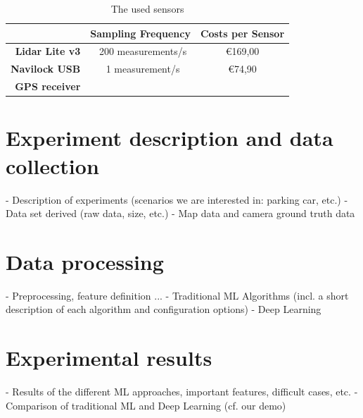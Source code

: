 \begin{table}

\bgroup
\def\arraystretch{1.5}
\begin{tabular}{| r || c | c |}
\hline
   & 
   \textbf{Sampling Frequency} & 
   \textbf{Costs per Sensor} \\
\hline
  \textbf{Lidar Lite v3} & 
   ~200 measurements/s &
   \euro{169,00} \\
\hline
  \textbf{Navilock USB} & 
   ~1 measurement/s &
   \euro{74,90} \\
   \textbf{GPS receiver} & & \\
\hline

\end{tabular}
\egroup

\caption{The used sensors}
\label{table:sensors_capabilities}
\end{table}


\section{Experiment description and data collection}
\label{sec:experiment_description_data_collection}
- Description of experiments (scenarios we are interested in: parking car, etc.)
- Data set derived (raw data, size, etc.)
- Map data and camera ground truth data

\section{Data processing}
\label{sec:data_processing}
- Preprocessing, feature definition ...
- Traditional ML Algorithms (incl. a short description of each algorithm and configuration options)
- Deep Learning

\section{Experimental results}
- Results of the different ML approaches, important features, difficult cases, etc.
- Comparison of traditional ML and Deep Learning (cf. our demo)